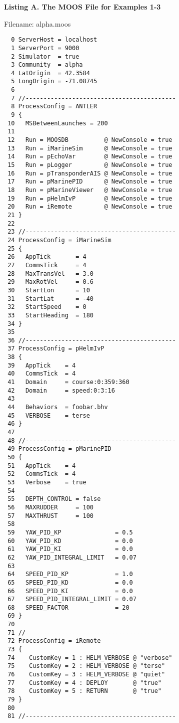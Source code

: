 \vspace{0.1in}
\noindent
{\bf {Listing A. The MOOS File for Examples 1-3}}
\label{alpha_moos}

\medskip
\noindent
Filename: alpha.moos

\scriptsize
\begin{verbatim}
  0 ServerHost = localhost
  1 ServerPort = 9000
  2 Simulator  = true
  3 Community  = alpha
  4 LatOrigin  = 42.3584
  5 LongOrigin = -71.08745
  6      
  7 //------------------------------------------
  8 ProcessConfig = ANTLER
  9 {
 10   MSBetweenLaunches = 200
 11   
 12   Run = MOOSDB          @ NewConsole = true
 13   Run = iMarineSim      @ NewConsole = true
 14   Run = pEchoVar        @ NewConsole = true
 15   Run = pLogger         @ NewConsole = true
 16   Run = pTransponderAIS @ NewConsole = true
 17   Run = pMarinePID      @ NewConsole = true
 18   Run = pMarineViewer   @ NewConsole = true
 19   Run = pHelmIvP        @ NewConsole = true
 20   Run = iRemote         @ NewConsole = true
 21 }
 22    
 23 //------------------------------------------
 24 ProcessConfig = iMarineSim
 25 {
 26   AppTick	    = 4
 27   CommsTick	    = 4
 28   MaxTransVel   = 3.0
 29   MaxRotVel     = 0.6
 30   StartLon      = 10
 31   StartLat      = -40
 32   StartSpeed    = 0
 33   StartHeading  = 180
 34 }
 35     
 36 //------------------------------------------
 37 ProcessConfig = pHelmIvP
 38 {
 39   AppTick    = 4
 40   CommsTick  = 4
 41   Domain     = course:0:359:360
 42   Domain     = speed:0:3:16
 43      
 44   Behaviors  = foobar.bhv
 45   VERBOSE    = terse
 46 }
 47     
 48 //------------------------------------------
 49 ProcessConfig = pMarinePID
 50 {
 51   AppTick    = 4
 52   CommsTick  = 4
 53   Verbose    = true
 54    
 55   DEPTH_CONTROL = false
 56   MAXRUDDER     = 100
 57   MAXTHRUST     = 100
 58    
 59   YAW_PID_KP               = 0.5
 60   YAW_PID_KD               = 0.0
 61   YAW_PID_KI               = 0.0
 62   YAW_PID_INTEGRAL_LIMIT   = 0.07
 63    
 64   SPEED_PID_KP             = 1.0
 65   SPEED_PID_KD             = 0.0
 66   SPEED_PID_KI             = 0.0
 67   SPEED_PID_INTEGRAL_LIMIT = 0.07
 68   SPEED_FACTOR             = 20
 69 }
 70    
 71 //------------------------------------------
 72 ProcessConfig = iRemote
 73 {
 74    CustomKey = 1 : HELM_VERBOSE @ "verbose"
 75    CustomKey = 2 : HELM_VERBOSE @ "terse"
 76    CustomKey = 3 : HELM_VERBOSE @ "quiet"
 77    CustomKey = 4 : DEPLOY       @ "true"
 78    CustomKey = 5 : RETURN       @ "true"
 79 }
 80    
 81 //------------------------------------------

\end{verbatim}
